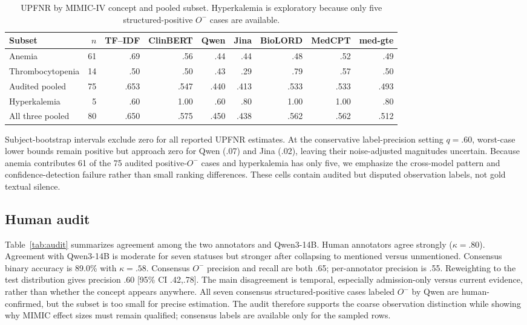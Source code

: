 \documentclass[11pt]{article}
\begin{document}
\begin{table}[t]
  \centering
  \footnotesize
  \renewcommand{\arraystretch}{1.07}
  \caption{UPFNR by MIMIC-IV concept and pooled subset. Hyperkalemia is
  exploratory because only five structured-positive $O^-$ cases are available.}
  \label{tab:mimic_concept}
  \begin{tabular*}{\textwidth}{@{\extracolsep{\fill}}lrrrrrrrr@{}}
    \toprule
    \textbf{Subset} & \textbf{$n$} & \textbf{TF--IDF} &
    \textbf{ClinBERT} & \textbf{Qwen} & \textbf{Jina} &
    \textbf{BioLORD} & \textbf{MedCPT} & \textbf{med-gte} \\
    \midrule
    Anemia           & 61 & .69 & .56 & .44 & .44 & .48 & .52 & .49 \\
    Thrombocytopenia & 14 & .50 & .50 & .43 & .29 & .79 & .57 & .50 \\
    Audited pooled   & 75 & .653 & .547 & .440 & .413 & .533 & .533 & .493 \\
    \midrule
    Hyperkalemia     &  5 & .60 & 1.00 & .60 & .80 & 1.00 & 1.00 & .80 \\
    All three pooled & 80 & .650 & .575 & .450 & .438 & .562 & .562 & .512 \\
    \bottomrule
  \end{tabular*}
\end{table}


Subject-bootstrap intervals exclude zero for all reported UPFNR estimates.
At the conservative label-precision setting $q=.60$, worst-case lower bounds
remain positive but approach zero for Qwen (.07) and Jina (.02), leaving their
noise-adjusted magnitudes uncertain. Because anemia contributes 61 of the 75
audited positive-$O^-$ cases and hyperkalemia has only five, we emphasize the
cross-model pattern and confidence-detection failure rather than small ranking
differences. These cells contain audited but disputed observation labels, not
gold textual silence.

\subsection{Human audit}
Table~\ref{tab:audit} summarizes agreement among the two annotators and
Qwen3-14B. Human annotators agree strongly ($\kappa=.80$). Agreement with Qwen3-14B is
moderate for seven statuses but stronger after collapsing to mentioned versus
unmentioned. Consensus binary accuracy is 89.0\% with $\kappa=.58$. Consensus $O^-$
precision and recall are both .65; per-annotator precision is .55. Reweighting
to the test distribution gives precision .60 [95\% CI .42,.78]. The main
disagreement is temporal, especially admission-only versus current evidence,
rather than whether the concept appears anywhere. All seven consensus structured-positive cases labeled $O^-$ by Qwen are
human-confirmed, but the subset is too small for precise estimation. The audit
therefore supports the coarse observation distinction while showing why MIMIC
effect sizes must remain qualified; consensus labels are available only for the
sampled rows.
\end{document}
